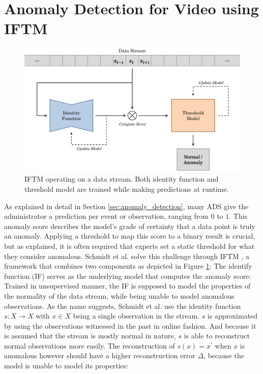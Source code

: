 \section{Anomaly Detection for Video using IFTM} \label{sec:vad}

\begin{figure}
	\centering
	\includegraphics[width=1\textwidth]{graphics/iftm/iftmOriginal/iftmOriginal.pdf}
  \caption[IFTM framework.]{IFTM operating on a data stream. Both identity function and threshold model are trained while making predictions at runtime.}
  \label{fig:iftm}
\end{figure}

As explained in detail in Section \ref{sec:anomaly_detection}, many ADS give the administrator a prediction per event or observation, ranging from $0$ to $1$. This anomaly score describes the model's grade of certainty that a data point is truly an anomaly. Applying a threshold to map this score to a binary result is crucial, but as explained, it is often required that experts set a static threshold for what they consider anomalous. Schmidt et al. solve this challenge through IFTM \cite{schmidt2018iftm}, a framework that combines two components as depicted in Figure \ref{fig:iftm}: The identify function (IF) serves as the underlying model that computes the anomaly score: Trained in unsupervised manner, the IF is supposed to model the properties of the normality of the data stream, while being unable to model anomalous observations. As the name suggests, Schmidt et al. use the identity function $s: X \rightarrow X$ with $x \in X$ being a single observation in the stream. $s$ is approximated by using the observations witnessed in the past in online fashion. And because it is assumed that the stream is mostly normal in nature, $s$ is able to reconstruct normal observations more easily. The reconstruction of $s(x)=x^{\prime}$ when $x$ is anomalous however should have a higher reconstruction error $\Delta$, because the model is unable to model its properties:

